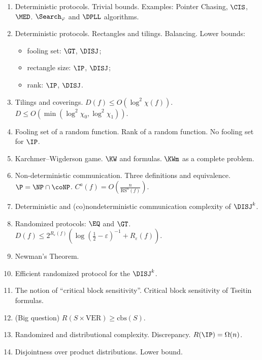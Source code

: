 





\begin{enumerate}
    \item Deterministic protocols. Trivial bounds. Examples: Pointer Chasing, $\CIS$,
        $\MED$. $\Search_{\varphi}$ and $\DPLL$ algorithms.
    \item Deterministic protocols. Rectangles and tilings. Balancing.
        Lower bounds:
        \begin{itemize}
            \item fooling set: $\GT$, $\DISJ$;
            \item rectangle size: $\IP$, $\DISJ$;
            \item rank: $\IP$, $\DISJ$.
        \end{itemize}
    \item Tilings and coverings. $D(f) \le O(\log^2 \chi(f))$.
        $D \le O(\min( \log^2 \chi_0, \log^2 \chi_1))$.
    \item Fooling set of a random function. Rank of a random function. No fooling set for $\IP$.
    \item Karchmer--Wigderson game. $\KW$ and formulas. $\KWm$ as a complete problem.
    \item Non-deterministic communication. Three definitions and equivalence. $\P = \NP \cap
        \coNP$. $C^a(f) = O\left(\frac{n}{\mathrm{RS}^a(f)}\right)$.
    \item Deterministic and (co)nondeterministic communication complexity of $\DISJ^k$.
    \item Randomized protocols: $\EQ$ and $\GT$.
        $D(f) \le 2^{R_{\varepsilon}(f)} \left( \log(\frac{1}{2} - \varepsilon)^{-1} + R_{\varepsilon}(f)
        \right)$.
    \item Newman's Theorem.
    \item Efficient randomized protocol for the $\DISJ^k$.
    \item The notion of ``critical block sensitivity''. Critical block sensitivity of Tseitin
        formulas.
    \item (Big question) $R(S \times \mathrm{VER}) \ge \mathrm{cbs}(S)$.
    \item Randomized and distributional complexity. Discrepancy. $R(\IP) = \Omega(n)$.
    \item Disjointness over product distributions. Lower bound.

\end{enumerate}
